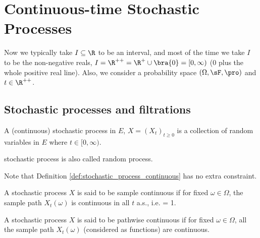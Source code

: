 \section{Continuous-time Stochastic Processes}

Now we typically take $I \subseteq \R$ to be an interval, and most of the time we take $I$ to be the non-negative reals, $I = \R^{++} = \R^+ \cup \bra{0} = [0,\infty)$ (0 plus the whole positive real line). Also, we
consider a probability space $(\Omega,\sF,\pro)$ and $t\in \R^{++}$.



\subsection{Stochastic processes and filtrations}

\begin{definition}\label{def:stochastic_process_continuous}
A (continuous) stochastic process in $E$, $X = (X_t)_{t\geq 0}$ is a collection of random variables in $E$ where $t\in [0,\infty)$.
\end{definition}

\begin{remark}
stochastic process is also called random process.
\end{remark}

Note that Definition \ref{def:stochastic_process_continuous} has no extra constraint.

\begin{definition}\label{def:sample_continuous_process}
A stochastic process $X$ is said to be sample continuous if for fixed $\omega \in \Omega$, the sample path $X_t(\omega)$ is continuous in all $t$ a.s., i.e.
\be
\pro{} = 1.
\ee
\end{definition}

\begin{definition}\label{def:pathwise_continuous_process}
A stochastic process $X$ is said to be pathwise continuous if for fixed $\omega \in \Omega$, all the sample path $X_t(\omega)$ (considered as functions) are continuous.
\end{definition}



